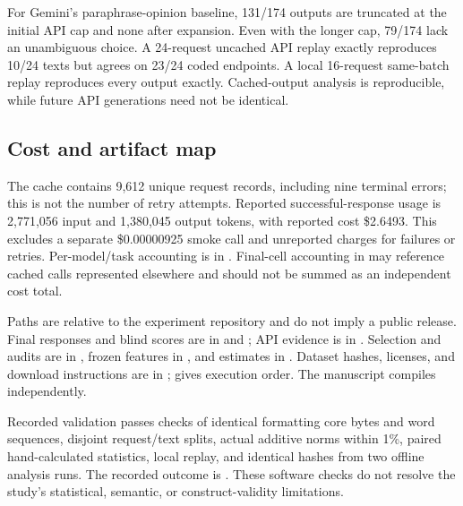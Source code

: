 For Gemini's paraphrase-opinion baseline, 131/174 outputs are truncated at the initial API cap and none after expansion. Even with the longer cap, 79/174 lack an unambiguous choice. A 24-request uncached API replay exactly reproduces 10/24 texts but agrees on 23/24 coded endpoints. A local 16-request same-batch replay reproduces every output exactly. Cached-output analysis is reproducible, while future API generations need not be identical.

\subsection{Cost and artifact map}
The cache contains 9,612 unique request records, including nine terminal errors; this is not the number of retry attempts. Reported successful-response usage is 2,771,056 input and 1,380,045 output tokens, with reported cost \$2.6493. This excludes a separate \$0.00000925 smoke call and unreported charges for failures or retries. Per-model/task accounting is in . Final-cell accounting in  may reference cached calls represented elsewhere and should not be summed as an independent cost total.

Paths are relative to the experiment repository and do not imply a public release. Final responses and blind scores are in  and ; API evidence is in . Selection and audits are in , frozen features in , and estimates in . Dataset hashes, licenses, and download instructions are in ;  gives execution order. The manuscript compiles independently.


Recorded validation passes checks of identical formatting core bytes and word sequences, disjoint request/text splits, actual additive norms within 1\%, paired hand-calculated statistics, local replay, and identical hashes from two offline analysis runs. The recorded outcome is . These software checks do not resolve the study's statistical, semantic, or construct-validity limitations.
